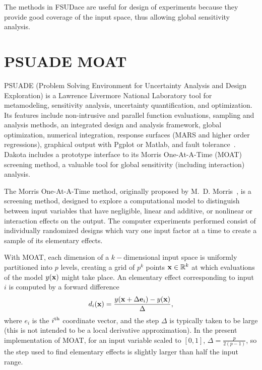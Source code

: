 The methods in FSUDace are useful for design of experiments because 
they provide good coverage of the input space, thus allowing global 
sensitivity analysis.  

\section{PSUADE MOAT}\label{dace:psuade}

PSUADE (Problem Solving Environment for Uncertainty Analysis and
Design Exploration) is a Lawrence Livermore National Laboratory tool
for metamodeling, sensitivity analysis, uncertainty quantification,
and optimization.  Its features include non-intrusive and parallel
function evaluations, sampling and analysis methods, an integrated
design and analysis framework, global optimization, numerical
integration, response surfaces (MARS and higher order regressions),
graphical output with Pgplot or Matlab, and fault
tolerance~\cite{Ton05}. Dakota includes a prototype interface to its
Morris One-At-A-Time (MOAT) screening method, a valuable tool for
global sensitivity (including interaction) analysis.

The Morris One-At-A-Time method, originally proposed by
M.~D. Morris~\cite{Mor91}, is a screening method, designed to explore
a computational model to distinguish between input variables that have
negligible, linear and additive, or nonlinear or interaction effects
on the output.  The computer experiments performed consist of
individually randomized designs which vary one input factor at a time
to create a sample of its elementary effects.

With MOAT, each dimension of a $k-$dimensional input space is
uniformly partitioned into $p$ levels, creating a grid of $p^k$ points
${\bf x} \in \mathbb{R}^k$ at which evaluations of the model $y({\bf
x})$ might take place.  An elementary effect corresponding to input
$i$ is computed by a forward difference
\begin{equation}
d_i({\bf x}) = \frac{y({\bf x} + \Delta {\bf e}_i) - y({\bf x})}{\Delta},
\end{equation}
where $e_i$ is the $i^{\mbox{\scriptsize th}}$ coordinate vector, and
the step $\Delta$ is typically taken to be large (this is not intended
to be a local derivative approximation).  In the present
implementation of MOAT, for an input variable scaled to $[0,1]$,
$\Delta = \frac{p}{2(p-1)}$, so the step used to find elementary
effects is slightly larger than half the input range.

